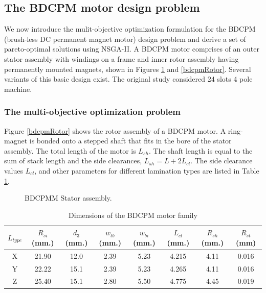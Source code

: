 \subsection{The BDCPM motor design problem}
We now introduce the mulit-objective optimization formulation for the BDCPM
(brush-less DC permanent magnet motor) design problem and derive a set of
pareto-optimal solutions using NSGA-II. A BDCPM motor comprises of an outer
stator assembly with windings on a frame and inner rotor assembly having
permanently mounted magnets, shown in Figures \ref{bdcpmStator} and
\ref{bdcpmRotor}. Several variants of this basic design exist. The original
study \citep{chidam99} considered 24 slots 4 pole machine.


\subsubsection{The multi-objective optimization problem}
Figure \ref{bdcpmRotor} shows the rotor assembly of a BDCPM motor. A
ring-magnet is bonded onto a stepped shaft that fits in the bore of the
stator assembly. The total length of the motor is $L_{sh}$. The shaft
length is equal to the sum of stack length and the side clearances, $
L_{sh} = L + 2L_{cl}$. The side clearance values $L_{cl}$, and other parameters for
different lamination types are listed in Table
\ref{ltypeDimTable}.

\begin{figure}[ht]\begin{center}
 \caption{BDCPMM Stator assembly.}
 \label{bdcpmStator}
\end{center}\end{figure}

\begin{table}[!ht]
  \centering
  \begin{tabular}{|c|c|c|c|c|c|c|c|}
    \hline
    $L_{type}$ & $R_{si}$ (mm.) & $d_3$ (mm.) & $w_{tb}$ (mm.) & $w_{bi}$ (mm.) & $L_{cl}$ (mm.)& $R_{sh}$ (mm.) & $R_{st}$ (mm) \\
    \hline
    X & 21.90 & 12.0 & 2.39 & 5.23 & 4.215 & 4.11 & 0.016 \\
    \hline
    Y & 22.22 & 15.1 & 2.39 & 5.23 & 4.265 & 4.11 & 0.016 \\
    \hline
    Z & 25.40 & 15.1 & 2.80 & 5.50 & 4.775 & 4.45 & 0.019 \\
    \hline
  \end{tabular}
  \caption{Dimensions of the BDCPM motor family}
  \label{ltypeDimTable}
\end{table}

